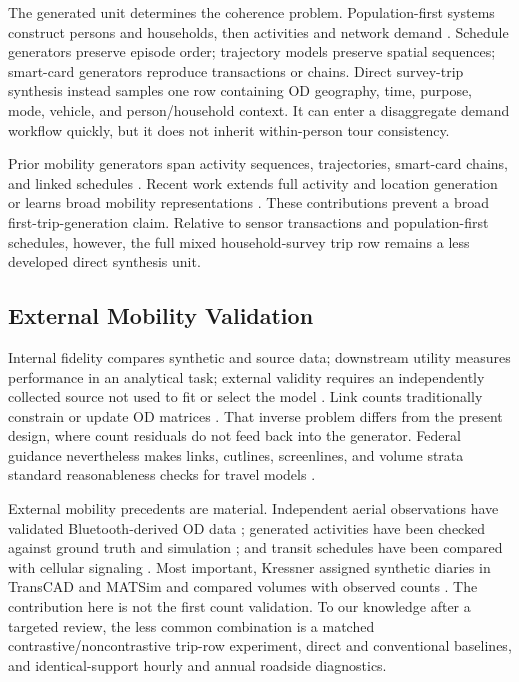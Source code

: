 \documentclass[numbered]{trbunofficial}
\begin{document}
The generated unit determines the coherence problem. Population-first systems construct persons and households, then activities and network demand \citep{joubert2020bayesian,horl2021paris}. Schedule generators preserve episode order; trajectory models preserve spatial sequences; smart-card generators reproduce transactions or chains. Direct survey-trip synthesis instead samples one row containing OD geography, time, purpose, mode, vehicle, and person/household context. It can enter a disaggregate demand workflow quickly, but it does not inherit within-person tour consistency.

Prior mobility generators span activity sequences, trajectories, smart-card chains, and linked schedules \citep{yin2018activities,huang2019urbanvae,choi2021trajgail,kim2022tripchains,lee2025collagan}. Recent work extends full activity and location generation or learns broad mobility representations \citep{shone2025scheduling,ma2025foundation,liao2026deepactivity,lu2026pop2actloc}. These contributions prevent a broad first-trip-generation claim. Relative to sensor transactions and population-first schedules, however, the full mixed household-survey trip row remains a less developed direct synthesis unit.



\subsection{External Mobility Validation}

Internal fidelity compares synthetic and source data; downstream utility measures performance in an analytical task; external validity requires an independently collected source not used to fit or select the model \citep{snoke2018utility}. Link counts traditionally constrain or update OD matrices \citep{vanzuylen1980counts,cascetta1984gls}. That inverse problem differs from the present design, where count residuals do not feed back into the generator. Federal guidance nevertheless makes links, cutlines, screenlines, and volume strata standard reasonableness checks for travel models \citep{fhwa2010validation}.

External mobility precedents are material. Independent aerial observations have validated Bluetooth-derived OD data \citep{chitturi2014odvalidation}; generated activities have been checked against ground truth and simulation \citep{yin2018activities}; and transit schedules have been compared with cellular signaling \citep{vo2026harnessing}. Most important, Kressner assigned synthetic diaries in TransCAD and MATSim and compared volumes with observed counts \citep{kressner2017nchrp}. The contribution here is not the first count validation. To our knowledge after a targeted review, the less common combination is a matched contrastive/noncontrastive trip-row experiment, direct and conventional baselines, and identical-support hourly and annual roadside diagnostics.
\end{document}
